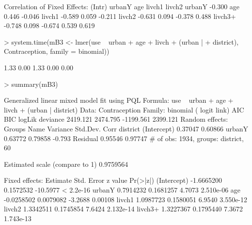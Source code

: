 \documentclass[12pt]{article}
\begin{document}
\begin{Schunk}
\begin{Soutput}
Correlation of Fixed Effects:
        (Intr) urbanY age    livch1 livch2
urbanY  -0.300                            
age      0.446 -0.046                     
livch1  -0.589  0.059 -0.211              
livch2  -0.631  0.094 -0.378  0.488       
livch3+ -0.748  0.098 -0.674  0.539  0.619
\end{Soutput}
\begin{Sinput}
> system.time(mB3 <- lmer(use ~ urban + age + livch + (urban | 
+     district), Contraception, family = binomial))
\end{Sinput}
\begin{Soutput}
[1] 1.33 0.00 1.33 0.00 0.00
\end{Soutput}
\begin{Sinput}
> summary(mB3)
\end{Sinput}
\begin{Soutput}
Generalized linear mixed model fit using PQL 
Formula: use ~ urban + age + livch + (urban | district) 
   Data: Contraception 
 Family: binomial ( logit link)
      AIC      BIC    logLik deviance
 2419.121 2474.795 -1199.561 2399.121
Random effects:
 Groups   Name        Variance Std.Dev. Corr   
 district (Intercept) 0.37047  0.60866         
          urbanY      0.63772  0.79858  -0.793 
 Residual             0.95546  0.97747         
# of obs: 1934, groups: district, 60

Estimated scale (compare to 1)  0.9759564 

Fixed effects:
              Estimate Std. Error  z value  Pr(>|z|)
(Intercept) -1.6665200  0.1572532 -10.5977 < 2.2e-16
urbanY       0.7914232  0.1681257   4.7073 2.510e-06
age         -0.0258502  0.0079082  -3.2688   0.00108
livch1       1.0987723  0.1580051   6.9540 3.550e-12
livch2       1.3342511  0.1745854   7.6424 2.132e-14
livch3+      1.3227367  0.1795440   7.3672 1.743e-13


\end{Soutput}
\end{Schunk}
\end{document}
